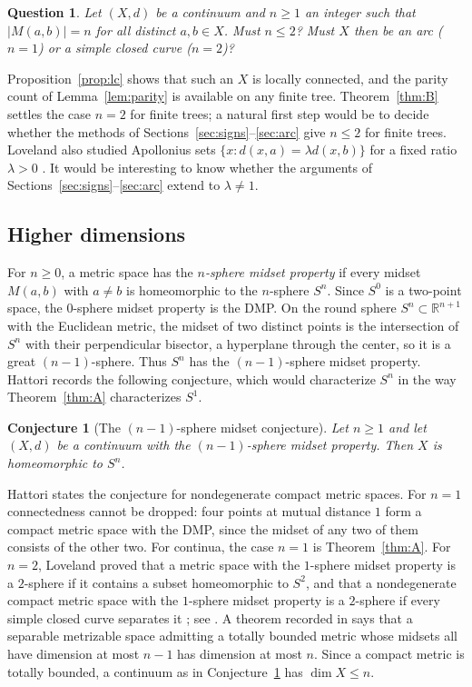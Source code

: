 \documentclass[11pt]{amsart}
\newtheorem{conjecture}[theorem]{Conjecture}
\newtheorem{question}[theorem]{Question}
\theoremstyle{definition}
\theoremstyle{remark}
\newcommand{\M}{M}
\begin{document}
\begin{question}
Let $(X,d)$ be a continuum and $n\ge1$ an integer such that $|\M(a,b)|=n$ for all distinct $a,b\in X$. Must $n\le2$? Must $X$ then be an arc ($n=1$) or a simple closed curve ($n=2$)?
\end{question}

\noindent
Proposition~\ref{prop:lc} shows that such an $X$ is locally connected, and the parity count of Lemma~\ref{lem:parity} is available on any finite tree. Theorem~\ref{thm:B} settles the case $n=2$ for finite trees; a natural first step would be to decide whether the methods of Sections~\ref{sec:signs}--\ref{sec:arc} give $n\le2$ for finite trees. Loveland also studied Apollonius sets $\{x:d(x,a)=\lambda d(x,b)\}$ for a fixed ratio $\lambda>0$ \cite{L76b}. It would be interesting to know whether the arguments of Sections~\ref{sec:signs}--\ref{sec:arc} extend to $\lambda\ne1$.

\subsection{Higher dimensions}
For $n\ge0$, a metric space has the \emph{$n$-sphere midset property} if every midset $\M(a,b)$ with $a\ne b$ is homeomorphic to the $n$-sphere $S^n$. Since $S^0$ is a two-point space, the $0$-sphere midset property is the DMP. On the round sphere $S^n\subset\mathbb R^{n+1}$ with the Euclidean metric, the midset of two distinct points is the intersection of $S^n$ with their perpendicular bisector, a hyperplane through the center, so it is a great $(n-1)$-sphere. Thus $S^n$ has the $(n-1)$-sphere midset property. Hattori \cite{H01} records the following conjecture, which would characterize $S^n$ in the way Theorem~\ref{thm:A} characterizes $S^1$.

\begin{conjecture}[The $(n-1)$-sphere midset conjecture]\label{conj:sphere}
Let $n\ge1$ and let $(X,d)$ be a continuum with the $(n-1)$-sphere midset property. Then $X$ is homeomorphic to $S^n$.
\end{conjecture}

\noindent
Hattori states the conjecture for nondegenerate compact metric spaces. For $n=1$ connectedness cannot be dropped: four points at mutual distance $1$ form a compact metric space with the DMP, since the midset of any two of them consists of the other two. For continua, the case $n=1$ is Theorem~\ref{thm:A}. For $n=2$, Loveland proved that a metric space with the $1$-sphere midset property is a $2$-sphere if it contains a subset homeomorphic to $S^2$, and that a nondegenerate compact metric space with the $1$-sphere midset property is a $2$-sphere if every simple closed curve separates it \cite{Lov77}; see \cite[Theorem~8]{H01}. A theorem recorded in \cite{H01} says that a separable metrizable space admitting a totally bounded metric whose midsets all have dimension at most $n-1$ has dimension at most $n$. Since a compact metric is totally bounded, a continuum as in Conjecture~\ref{conj:sphere} has $\dim X\le n$.
\end{document}
